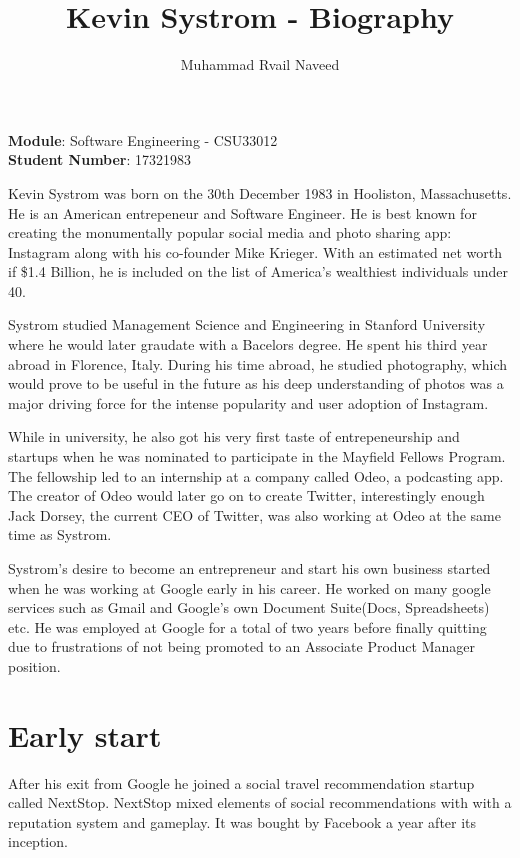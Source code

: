 \documentclass[12pt]{article}
\title{\textbf{Kevin  Systrom -  Biography}}
\author{Muhammad Rvail Naveed}
\date{}
\begin{document}
    \maketitle

    \begin{center}
        \textbf{Module}: Software Engineering - CSU33012 \\
        \textbf{Student Number}: 17321983 
    \end{center}

    \newpage

    Kevin Systrom was born on the 30th December 1983 in Hooliston, Massachusetts. He is 
    an American entrepeneur and Software Engineer. He is best known for creating the monumentally
    popular social media and photo sharing app: Instagram along with his co-founder Mike Krieger. With an estimated net
    worth if \$1.4 Billion, he is included on the list of America's wealthiest individuals under 40.

    Systrom studied Management Science and Engineering in Stanford University 
    where he would later graudate with a Bacelors degree. He spent his third year abroad in Florence, Italy.
    During his time abroad, he studied photography, which would prove to be useful in the future as his deep understanding of photos
    was a major driving force for the intense popularity and user adoption of Instagram.

    While in university, 
    he also got his very first taste of entrepeneurship 
    and startups when he was nominated to participate in the Mayfield Fellows Program. 
    The fellowship led to an internship at a company called Odeo, a podcasting app. The creator of Odeo
    would later go on to create Twitter, interestingly enough Jack Dorsey, the current CEO of Twitter, 
    was also working at Odeo at the same time as Systrom.

    Systrom's desire to become an entrepreneur
    and start his own business started when he was working at Google early in his career. He worked on many google services such as Gmail and Google's own
    Document Suite(Docs, Spreadsheets) etc. He was employed at Google for a total of two years before finally quitting
    due to frustrations of not being promoted to an Associate Product Manager position.

    \section{Early start}
    After his exit from Google he joined a social travel recommendation startup called 
    NextStop. NextStop mixed elements of social recommendations with
    with a reputation system and gameplay. It was bought by Facebook a year after its inception.
\end{document}

